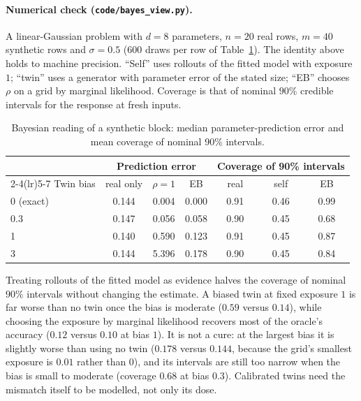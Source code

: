 \paragraph{Numerical check (\texttt{code/bayes\_view.py}).} A linear-Gaussian problem with $d=8$ parameters, $n=20$ real rows, $m=40$ synthetic rows and $\sigma=0.5$ (600 draws per row of Table~\ref{tab:bayes}). The identity above holds to machine precision. ``Self'' uses rollouts of the fitted model with exposure $1$; ``twin'' uses a generator with parameter error of the stated size; ``EB'' chooses $\rho$ on a grid by marginal likelihood. Coverage is that of nominal $90\%$ credible intervals for the response at fresh inputs.
\begin{table}[H]\centering\small
\caption{Bayesian reading of a synthetic block: median parameter-prediction error and mean coverage of nominal 90\% intervals.}\label{tab:bayes}
\begin{tabular}{@{}lcccccc@{}}
\toprule
 & \multicolumn{3}{c}{Prediction error} & \multicolumn{3}{c}{Coverage of 90\% intervals}\\
\cmidrule(lr){2-4}\cmidrule(lr){5-7}
Twin bias & real only & $\rho{=}1$ & EB & real & self & EB\\
\midrule
0 (exact) & 0.144 & 0.004 & 0.000 & 0.91 & 0.46 & 0.99\\
0.3 & 0.147 & 0.056 & 0.058 & 0.90 & 0.45 & 0.68\\
1 & 0.140 & 0.590 & 0.123 & 0.91 & 0.45 & 0.87\\
3 & 0.144 & 5.396 & 0.178 & 0.90 & 0.45 & 0.84\\
\bottomrule
\end{tabular}
\end{table}
Treating rollouts of the fitted model as evidence halves the coverage of nominal $90\%$ intervals without changing the estimate. A biased twin at fixed exposure $1$ is far worse than no twin once the bias is moderate ($0.59$ versus $0.14$), while choosing the exposure by marginal likelihood recovers most of the oracle's accuracy ($0.12$ versus $0.10$ at bias $1$). It is not a cure: at the largest bias it is slightly worse than using no twin ($0.178$ versus $0.144$, because the grid's smallest exposure is $0.01$ rather than $0$), and its intervals are still too narrow when the bias is small to moderate (coverage $0.68$ at bias $0.3$). Calibrated twins need the mismatch itself to be modelled, not only its dose.

